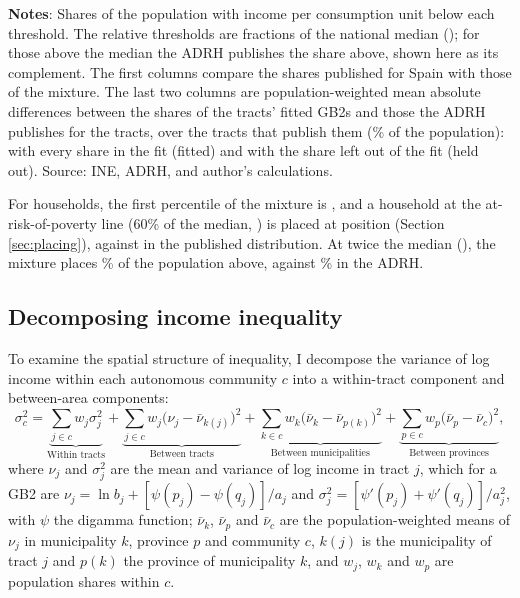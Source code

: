 \begin{table}[H]
\centering
\begin{threeparttable}
\onehalfspacing
\caption{Share of the population below income thresholds}\label{tab:thresholds}
\footnotesize

\begin{tablenotes}
\scriptsize
\textbf{Notes}: Shares of the population with income per consumption unit below each threshold. The relative thresholds are fractions of the national median (\texteuro\AdrhNatMedian{}); for those above the median the ADRH publishes the share above, shown here as its complement. The first columns compare the shares published for Spain with those of the mixture. The last two columns are population-weighted mean absolute differences between the shares of the tracts' fitted GB2s and those the ADRH publishes for the tracts, over the tracts that publish them (\ShareTractsPopPct{}\% of the population): with every share in the fit (fitted) and with the share left out of the fit (held out). Source: INE, ADRH, and author's calculations.
\end{tablenotes}
\end{threeparttable}
\end{table}

For households, the first percentile of the mixture is \texteuro\MixPOne{}, and a household at the at-risk-of-poverty line (60\% of the median, \texteuro\ThrPovEuro{}) is placed at position \ThrPovModelP{} (Section \ref{sec:placing}), against \ThrPovObsP{} in the published distribution. At twice the median (\texteuro\ThrTopEuro{}), the mixture places \ThrTopModel{}\% of the population above, against \ThrTopObs{}\% in the ADRH.

\subsection{Decomposing income inequality}

To examine the spatial structure of inequality, I decompose the variance of log income within each autonomous community $c$ into a within-tract component and between-area components:
\begin{equation}\label{decomp}
\sigma^2_{c} =
\underbrace{\sum_{j \in c} w_j \sigma^2_{j}}_{\text{Within tracts}} +
\underbrace{\sum_{j \in c} w_j \big( \nu_{j} - \bar\nu_{k(j)} \big)^2}_{\text{Between tracts}} +
\underbrace{\sum_{k \in c} w_k \big( \bar\nu_{k} - \bar\nu_{p(k)} \big)^2}_{\text{Between municipalities}} +
\underbrace{\sum_{p \in c} w_p \big( \bar\nu_{p} - \bar\nu_{c} \big)^2}_{\text{Between provinces}},
\end{equation}
where $\nu_j$ and $\sigma_j^2$ are the mean and variance of log income in tract $j$, which for a GB2 are $\nu_j = \ln b_j + [\psi(p_j) - \psi(q_j)]/a_j$ and $\sigma_j^2 = [\psi'(p_j) + \psi'(q_j)]/a_j^2$, with $\psi$ the digamma function; $\bar\nu_k$, $\bar\nu_p$ and $\bar\nu_c$ are the population-weighted means of $\nu_j$ in municipality $k$, province $p$ and community $c$, $k(j)$ is the municipality of tract $j$ and $p(k)$ the province of municipality $k$, and $w_j$, $w_k$ and $w_p$ are population shares within $c$.

